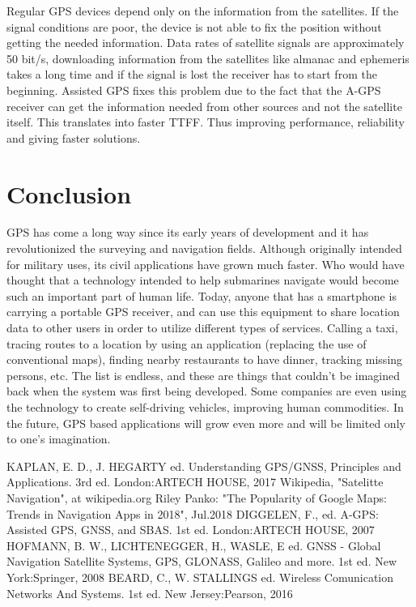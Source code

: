 \documentclass[conference]{IEEEtran}
\begin{document}
Regular GPS devices depend only on the information from the satellites. If the signal conditions are poor, the device is not able to fix the position without getting the needed information. Data rates of satellite signals are approximately 50 bit/s, downloading information from the satellites like almanac and ephemeris takes a long time and if the signal is lost the receiver has to start from the beginning.
Assisted GPS fixes this problem due to the fact that the A-GPS receiver can get the information needed from other sources and not the satellite itself. This translates into faster TTFF. Thus improving performance, reliability and giving faster solutions.

\section{Conclusion}

GPS has come a long way since its early years of development and it has revolutionized the surveying and navigation fields. Although originally intended for military uses, its civil applications have grown much faster. Who would have thought that a technology intended to help submarines navigate would become such an important part of human life. Today, anyone that has a smartphone is carrying a portable GPS receiver, and can use this equipment to share location data to other users in order to utilize different types of services. Calling a taxi, tracing routes to a location by using an application (replacing the use of conventional maps), finding nearby restaurants to have dinner, tracking missing persons, etc. The list is endless, and these are things that couldn't be imagined back when the system was first being developed. Some companies are even using the technology to create self-driving vehicles, improving human commodities. In the future, GPS based applications will grow even more and will be limited only to one's imagination.

\begin{thebibliography}{00}
 KAPLAN, E. D., J. HEGARTY ed. Understanding GPS/GNSS, Principles and Applications. 3rd ed. London:ARTECH HOUSE, 2017
 Wikipedia, "Satelitte Navigation", at wikipedia.org
 Riley Panko: "The Popularity of Google Maps: Trends in Navigation Apps in 2018", Jul.2018
 DIGGELEN, F., ed. A-GPS: Assisted GPS, GNSS, and SBAS. 1st ed. London:ARTECH HOUSE, 2007
 HOFMANN, B. W., LICHTENEGGER, H., WASLE, E ed. GNSS - Global Navigation Satellite Systems, GPS, GLONASS, Galileo and more. 1st ed. New York:Springer, 2008
 BEARD, C., W. STALLINGS ed. Wireless Comunication Networks And Systems. 1st ed. New Jersey:Pearson, 2016

\end{thebibliography}
\end{document}
